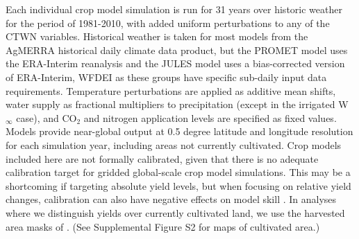 \documentclass[gmdd]{copernicus} %
\begin{document}
Each individual crop model simulation is run for 31 years over historic weather for the period of 1981-2010, with added uniform perturbations to any of the CTWN variables.
Historical weather is taken for most models from the AgMERRA \citep{Ruane2015} historical daily climate data product, but the PROMET model uses the ERA-Interim reanalysis \citep{dee2011era} and the JULES model uses a bias-corrected version of ERA-Interim, WFDEI \citep[WATCH-Forcing-Data-ERA-Interim,][]{weedon2014wfdei} as these groups have specific sub-daily input data requirements. 
Temperature perturbations are applied as additive mean shifts, water supply as fractional multipliers to precipitation (except in the irrigated W$_{\infty}$ case), and CO$_2$ and nitrogen application levels are specified as fixed values. 
Models provide near-global output at 0.5 degree latitude and longitude resolution for each simulation year, including areas not currently cultivated. 
Crop models included here are not formally calibrated, given that there is no adequate calibration target for gridded global-scale crop model simulations. 
This may be a shortcoming if targeting absolute yield levels, but when focusing on relative yield changes, calibration can also have negative effects on model skill \citep{muller_global_2017}.
In analyses where we distinguish yields over currently cultivated land, we use the harvested area masks of \citet{Portmann2010}. 
(See Supplemental Figure S2 for maps of cultivated area.)

\end{document}

